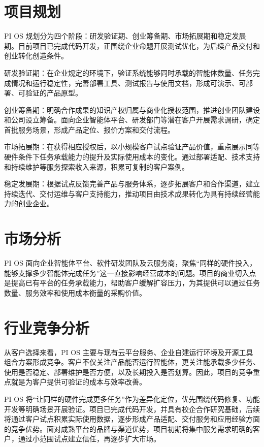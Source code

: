 \section{项目规划}\label{sec:1.3}
PI OS 规划分为四个阶段：研发验证期、创业筹备期、市场拓展期和稳定发展期。目前项目已完成代码开发，正围绕企业命题开展测试优化，为后续产品交付和创业转化创造条件。

研发验证期：在企业规定的环境下，验证系统能够同时承载的智能体数量、任务完成情况和运行稳定性，完善部署工具、测试报告与使用文档，形成可演示、可部署、可验证的产品原型。

创业筹备期：明确合作成果的知识产权归属与商业化授权范围，推进创业团队建设和公司设立筹备。面向企业智能体平台、研发部门等潜在客户开展需求调研，确定首批服务场景，形成产品定位、报价方案和交付流程。

市场拓展期：在获得相应授权后，以小规模客户试点验证产品价值，重点展示同等硬件条件下任务承载能力的提升及实际使用成本的变化。通过部署适配、技术支持和持续维护等服务探索收入来源，积累可复制的客户案例。

稳定发展期：根据试点反馈完善产品与服务体系，逐步拓展客户和合作渠道，建立持续迭代、交付运维与客户支持能力，推动项目由技术成果转化为具有持续经营能力的创业企业。

\section{市场分析}\label{sec:1.4}
PI OS 面向企业智能体平台、软件研发团队及云服务商，聚焦“同样的硬件投入，能够支撑多少智能体完成任务”这一直接影响经营成本的问题。项目的商业切入点是提高已有平台的任务承载能力，帮助客户缓解扩容压力，为其提供可以通过任务数量、服务效率和使用成本衡量的采购价值。

\section{行业竞争分析}\label{sec:1.5}
从客户选择来看，PI OS 主要与现有云平台服务、企业自建运行环境及开源工具组合方案形成竞争。客户不仅关注产品能否运行智能体，更关注能承载多少任务、使用是否稳定、部署维护是否方便，以及长期投入是否划算。因此，项目的竞争重点就是为客户提供可验证的成本与效率改善。

PI OS 将“让同样的硬件完成更多任务”作为差异化定位，优先围绕代码修复、功能开发等明确场景开展验证。项目已完成代码开发，并具有校企合作研究基础，后续将通过客户试点积累实际使用数据，逐步形成产品适配、交付服务和应用经验方面的竞争优势。面对成熟平台的品牌与渠道优势，项目初期将集中服务需求明确的客户，通过小范围试点建立信任，再逐步扩大市场。

